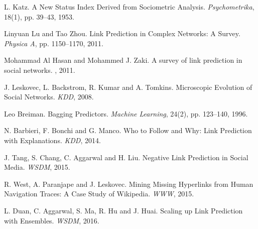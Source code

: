 \documentclass[10pt,journal,compsoc]{IEEEtran}
\begin{document}
\begin{thebibliography}{1}
L. Katz. A New Status Index Derived from Sociometric Analysis. {\em Psychometrika}, 18(1), pp. 39--43, 1953.

Linyuan Lu and Tao Zhou. Link Prediction in Complex Networks: A Survey.
{\em Physica A}, pp. 1150--1170, 2011.

Mohammad Al Hasan and Mohammed J. Zaki.
\newblock A survey of link prediction in social networks.
, 2011.

J. Leskovec, L. Backstrom, R. Kumar and A. Tomkins. Microscopic Evolution of Social Networks.
{\em KDD}, 2008.

Leo Breiman. Bagging Predictors. {\em Machine Learning},
24(2), pp. 123--140, 1996.

N. Barbieri, F. Bonchi and G. Manco. Who to Follow and Why: Link Prediction with Explanations.
{\em KDD}, 2014.

J. Tang, S. Chang, C. Aggarwal and H. Liu. Negative Link Prediction in Social Media.
{\em WSDM}, 2015.

R. West, A. Paranjape and J. Leskovec. Mining Missing Hyperlinks from Human Navigation Traces:
A Case Study of Wikipedia. {\em WWW}, 2015.

L. Duan, C. Aggarwal, S. Ma, R. Hu and J. Huai. Scaling up Link Prediction with Ensembles.
{\em WSDM}, 2016.





\end{thebibliography}

%





\end{document}
